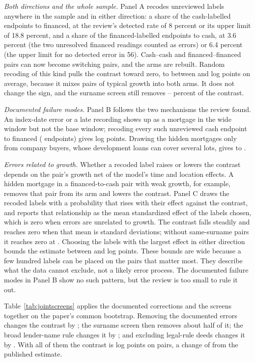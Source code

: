 \documentclass[12pt]{article}
\begin{document}
\textit{Both directions and the whole sample.} Panel A recodes unreviewed labels anywhere in the sample and in either direction: a share of the \MisCashEnds{} cash-labelled endpoints to financed, at the review's detected rate of 8 percent or its upper limit of 18.8 percent, and a share of the \MisFinEnds{} financed-labelled endpoints to cash, at 3.6 percent (the two unresolved financed readings counted as errors) or 6.4 percent (the upper limit for no detected error in 56). Cash--cash and financed--financed pairs can now become switching pairs, and the arms are rebuilt. Random recoding of this kind pulls the contrast toward zero, to between \MisRandLow{} and \MisRandHigh{} log points on average, because it mixes pairs of typical growth into both arms. It does not change the sign, and the surname screen still removes \MisShareLow{}--\MisShareHigh{} percent of the contrast.

\textit{Documented failure modes.} Panel B follows the two mechanisms the review found. An index-date error or a late recording shows up as a mortgage in the wide window but not the base window; recoding every such unreviewed cash endpoint to financed (\MisLateN{} endpoints) gives \MisLate{} log points. Drawing the hidden mortgages only from company buyers, whose development loans can cover several lots, gives \MisCompanyLow{} to \MisCompanyHigh{}.

\textit{Errors related to growth.} Whether a recoded label raises or lowers the contrast depends on the pair's growth net of the model's time and location effects. A hidden mortgage in a financed-to-cash pair with weak growth, for example, removes that pair from its arm and lowers the contrast. Panel C draws the \MisSweepRecoded{} recoded labels with a probability that rises with their effect against the contrast, and reports that relationship as the mean standardized effect of the labels chosen, which is zero when errors are unrelated to growth. The contrast falls steadily and reaches zero when that mean is \MisBreakFull{} standard deviations; without same-surname pairs it reaches zero at \MisBreakNoRel{}. Choosing the labels with the largest effect in either direction bounds the estimate between \MisAdvAgainst{} and \MisAdvFor{} log points. These bounds are wide because a few hundred labels can be placed on the pairs that matter most. They describe what the data cannot exclude, not a likely error process. The documented failure modes in Panel B show no such pattern, but the review is too small to rule it out.

Table~\ref{tab:jointscreens} applies the documented corrections and the screens together on the paper's common bootstrap. Removing the documented errors changes the contrast by \JointDocChange{} \JointDocChangeCI{}; the surname screen then removes about half of it; the broad lender-name rule changes it by \JointBroadStep{}; and excluding legal-rule deeds changes it by \JointLegalStep{} \JointLegalStepCI{}. With all of them the contrast is \JointAll{} log points \JointAllCI{} on \JointAllPairs{} pairs, a change of \JointAllChange{} \JointAllChangeCI{} from the published estimate.
\end{document}
